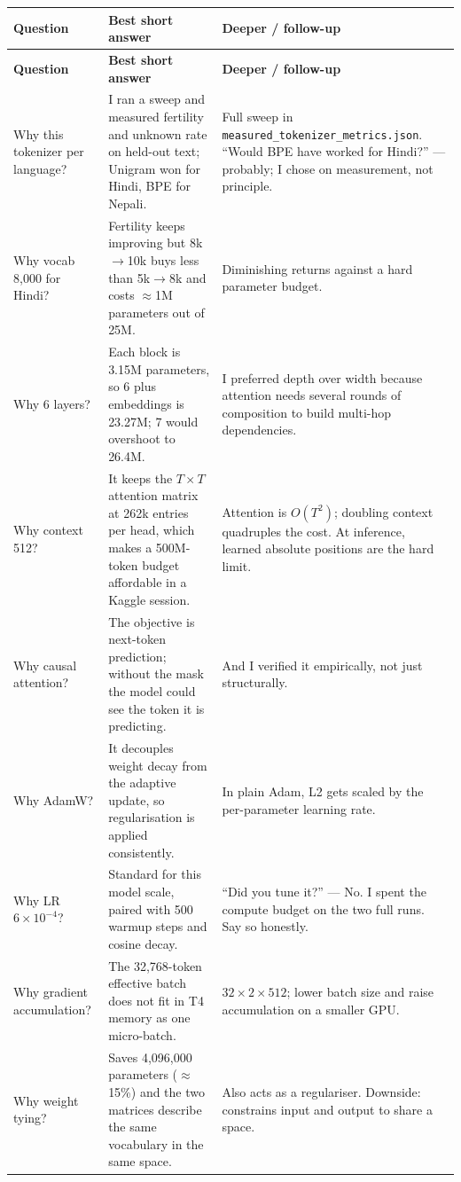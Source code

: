 \documentclass[11pt]{report}
\begin{document}
\begin{longtable}{@{}p{3.0cm}p{5.2cm}p{5.8cm}@{}}
\toprule
\textbf{Question} & \textbf{Best short answer} & \textbf{Deeper / follow-up} \\
\midrule
\endfirsthead
\toprule
\textbf{Question} & \textbf{Best short answer} & \textbf{Deeper / follow-up} \\
\midrule
\endhead
Why this tokenizer per language? & I ran a sweep and measured fertility and unknown rate on held-out text; Unigram won for Hindi, BPE for Nepali. & Full sweep in \texttt{measured\_tokenizer\_metrics.json}. ``Would BPE have worked for Hindi?'' --- probably; I chose on measurement, not principle. \\
Why vocab 8,000 for Hindi? & Fertility keeps improving but 8k$\to$10k buys less than 5k$\to$8k and costs ${\approx}$1M parameters out of 25M. & Diminishing returns against a hard parameter budget. \\
Why 6 layers? & Each block is 3.15M parameters, so 6 plus embeddings is 23.27M; 7 would overshoot to 26.4M. & I preferred depth over width because attention needs several rounds of composition to build multi-hop dependencies. \\
Why context 512? & It keeps the $T\times T$ attention matrix at 262k entries per head, which makes a 500M-token budget affordable in a Kaggle session. & Attention is $O(T^2)$; doubling context quadruples the cost. At inference, learned absolute positions are the hard limit. \\
Why causal attention? & The objective is next-token prediction; without the mask the model could see the token it is predicting. & And I verified it empirically, not just structurally. \\
Why AdamW? & It decouples weight decay from the adaptive update, so regularisation is applied consistently. & In plain Adam, L2 gets scaled by the per-parameter learning rate. \\
Why LR $6\times10^{-4}$? & Standard for this model scale, paired with 500 warmup steps and cosine decay. & ``Did you tune it?'' --- No. I spent the compute budget on the two full runs. Say so honestly. \\
Why gradient accumulation? & The 32,768-token effective batch does not fit in T4 memory as one micro-batch. & $32 \times 2 \times 512$; lower batch size and raise accumulation on a smaller GPU. \\
Why weight tying? & Saves 4,096,000 parameters ($\approx$15\%) and the two matrices describe the same vocabulary in the same space. & Also acts as a regulariser. Downside: constrains input and output to share a space. \\

\end{longtable}
\end{document}
